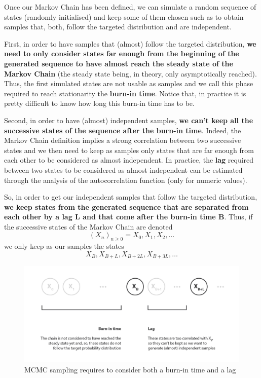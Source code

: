 Once our Markov Chain has been defined, we can simulate a random sequence of states (randomly initialised) and keep some of them chosen such as to obtain samples that, both, follow the targeted distribution and are independent.

First, in order to have samples that (almost) follow the targeted distribution, \textbf{we need to only consider states far enough from the beginning of the generated sequence to have almost reach the steady state of the Markov Chain} (the steady state being, in theory, only asymptotically reached). Thus, the first simulated states are not usable as samples and we call this phase required to reach stationarity the \textbf{burn-in time}. Notice that, in practice it is pretty difficult to know how long this burn-in time has to be.

Second, in order to have (almost) independent samples, \textbf{we can't keep all the successive states of the sequence after the burn-in time}. Indeed, the Markov Chain definition implies a strong correlation between two successive states and we then need to keep as samples only states that are far enough from each other to be considered as almost independent. In practice, the \textbf{lag} required between two states to be considered as almost independent can be estimated through the analysis of the autocorrelation function (only for numeric values).

So, in order to get our independent samples that follow the targeted distribution, \textbf{we keep states from the generated sequence that are separated from each other by a lag L and that come after the burn-in time B}. Thus, if the successive states of the Markov Chain are denoted
\begin{equation}\left(X_{n}\right)_{n \geq 0}=X_{0}, X_{1}, X_{2}, \dots\end{equation}
we only keep as our samples the states
\begin{equation}X_{B}, X_{B+L}, X_{B+2 L}, X_{B+3 L}, \dots\end{equation}

\begin{figure}[h]
    \centering
\includegraphics[width=\textwidth]{pic/p05c08-snip05.png}
    \caption{MCMC sampling requires to consider both a burn-in time and a lag}
    \label{fig:p05c08-snip05}
\end{figure}


